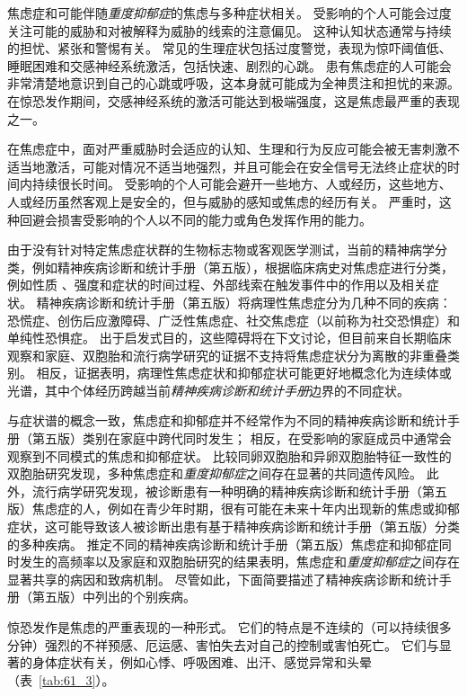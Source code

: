 焦虑症和可能伴随\textit{重度抑郁症}的焦虑与多种症状相关。
受影响的个人可能会过度关注可能的威胁和对被解释为威胁的线索的注意偏见。
这种认知状态通常与持续的担忧、紧张和警惕有关。
常见的生理症状包括过度警觉，表现为惊吓阈值低、睡眠困难和交感神经系统激活，包括快速、剧烈的心跳。
患有焦虑症的人可能会非常清楚地意识到自己的心跳或呼吸，这本身就可能成为全神贯注和担忧的来源。
在惊恐发作期间，交感神经系统的激活可能达到极端强度，这是焦虑最严重的表现之一。


在焦虑症中，面对严重威胁时会适应的认知、生理和行为反应可能会被无害刺激不适当地激活，可能对情况不适当地强烈，并且可能会在安全信号无法终止症状的时间内持续很长时间。
受影响的个人可能会避开一些地方、人或经历，这些地方、人或经历虽然客观上是安全的，但与威胁的感知或焦虑的经历有关。
严重时，这种回避会损害受影响的个人以不同的能力或角色发挥作用的能力。


由于没有针对特定焦虑症状群的生物标志物或客观医学测试，当前的精神病学分类，例如精神疾病诊断和统计手册（第五版），根据临床病史对焦虑症进行分类，例如性质 、强度和症状的时间过程、外部线索在触发事件中的作用以及相关症状。
精神疾病诊断和统计手册（第五版）将病理性焦虑症分为几种不同的疾病：恐慌症、创伤后应激障碍、广泛性焦虑症、社交焦虑症（以前称为社交恐惧症）和单纯性恐惧症。
出于启发式目的，这些障碍将在下文讨论，但目前来自长期临床观察和家庭、双胞胎和流行病学研究的证据不支持将焦虑症状分为离散的非重叠类别。
相反，证据表明，病理性焦虑症状和抑郁症状可能更好地概念化为连续体或光谱，其中个体经历跨越当前\textit{精神疾病诊断和统计手册}边界的不同症状。


与症状谱的概念一致，焦虑症和抑郁症并不经常作为不同的精神疾病诊断和统计手册（第五版）类别在家庭中跨代同时发生；
相反，在受影响的家庭成员中通常会观察到不同模式的焦虑和抑郁症状。
比较同卵双胞胎和异卵双胞胎特征一致性的双胞胎研究发现，多种焦虑症和\textit{重度抑郁症}之间存在显著的共同遗传风险。
此外，流行病学研究发现，被诊断患有一种明确的精神疾病诊断和统计手册（第五版）焦虑症的人，例如在青少年时期，很有可能在未来十年内出现新的焦虑或抑郁症状，这可能导致该人被诊断出患有基于精神疾病诊断和统计手册（第五版）分类的多种疾病。
推定不同的精神疾病诊断和统计手册（第五版）焦虑症和抑郁症同时发生的高频率以及家庭和双胞胎研究的结果表明，焦虑症和\textit{重度抑郁症}之间存在显著共享的病因和致病机制。
尽管如此，下面简要描述了精神疾病诊断和统计手册（第五版）中列出的个别疾病。


惊恐发作是焦虑的严重表现的一种形式。
它们的特点是不连续的（可以持续很多分钟）强烈的不祥预感、厄运感、害怕失去对自己的控制或害怕死亡。
它们与显著的身体症状有关，例如心悸、呼吸困难、出汗、感觉异常和头晕（表~\ref{tab:61_3}）。


